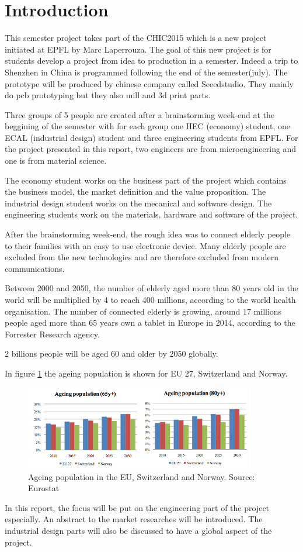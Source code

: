 \section{Introduction}

This semester project takes part of the CHIC2015 which is a new project initiated at EPFL by Marc Laperrouza. The goal of this new project is for students develop a project from idea to production in a semester. Indeed a trip to Shenzhen in China is programmed following the end of the semester(july). The prototype will be produced by chinese company called Seeedstudio. They mainly do pcb prototyping but they also mill and 3d print parts.

Three groups of 5 people are created after a brainstorming week-end at the beggining of the semester with for each group one HEC (economy) student, one ECAL (industrial design) student and three engineering students from EPFL. For the project presented in this report, two engineers are from microengineering and one is from material science.

The economy student works on the business part of the project which contains the business model, the market definition and the value proposition. The industrial design student works on the mecanical and software design. The engineering students work on the materials, hardware and software of the project.

After the brainstorming week-end, the rough idea was to connect elderly people to their families with an easy to use electronic device. Many elderly people are excluded from the new technologies and are therefore excluded from modern communications.

Between 2000 and 2050, the number of elderly aged more than 80 years old in the world will be multiplied by 4 to reach 400 millions, according to the world health organisation. The number of connected elderly is growing, around 17 millions people aged more than 65 years own a tablet in Europe in 2014, according to the Forrester Research agency.

2 billions people will be aged 60 and older by 2050 globally.

In figure \ref{fig:population} the ageing population is shown for EU 27, Switzerland and Norway.
\begin{figure}[!htb]
    \centering
    \includegraphics[width=0.9\textwidth,keepaspectratio]{chap/marketFig/population.png}
    \caption{Ageing population in the EU, Switzerland and Norway. Source: Eurostat}
    \label{fig:population}
\end{figure}

In this report, the focus will be put on the engineering part of the project especially. An abstract to the market researches will be introduced. The industrial design parts will also be discussed to have a global aspect of the project.
